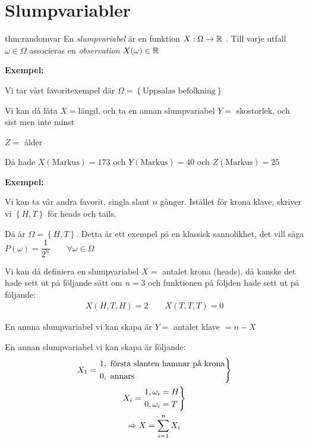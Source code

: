 \section{Slumpvariabler}
\par\bigskip
\begin{theo}[Slumpvariabel]{thm:randomvar}
  En \textit{slumpvariabel} är en funktion $X:\Omega\to\mathbb{R}$ . Till varje utfall $\omega\in\Omega$ associeras en \textit{observation} $X(\omega)\in\mathbb{R}$
\end{theo}
\par\bigskip
\noindent\textbf{Exempel:}\par
\noindent Vi tar vårt favoritexempel där $\Omega = \left\{\text{Uppsalas befolkning}\right\}$ \par
\noindent Vi kan då låta $X = $längd, och ta en annan slumpvariabel $Y = $ skostorlek, och sist men inte minst\par\noindent $Z =$ ålder\par
\noindent Då hade $X(\text{Markus}) = 173$ och $Y(\text{Markus}) = 40$ och $Z(\text{Markus})=25$
\par\bigskip
\noindent\textbf{Exempel:}\par
\noindent Vi kan ta vår andra favorit, singla slant $n$ gånger. Istället för krona klave, skriver vi $\left\{H,T\right\}$ för heads och tails.\par
\noindent Då är $\Omega = \left\{H,T\right\}$. Detta är ett exempel på en klassisk sannolikhet, det vill säga $P(\omega) = \dfrac{1}{2^n}\qquad\forall \omega\in\Omega$\par
\noindent Vi kan då definiera en slumpvariabel $X=$ antalet krona (heads), då kanske det hade sett ut på följande sätt om $n=3$ och funktionen på följden hade sett ut på följande:
\begin{equation*}
  \begin{gathered}
    X(H,T,H) = 2\qquad X(T,T,T) = 0
  \end{gathered}
\end{equation*}
\par\bigskip
\noindent En annna slumpvariabel vi kan skapa är $Y=$ antalet klave $=n-X$\par
\noindent En annan slumpvariabel vi kan skapa är följande:
\begin{equation*}
  \begin{gathered}
    X_1=
    \begin{rcases*}
      1,\text{ första slanten hamnar på krona}\\
      0, \text{ annars}
    \end{rcases*}\\
    X_i =
    \begin{rcases*}
      1, \omega_i = H\\
      0, \omega_i = T
    \end{rcases*}\\
    \Rightarrow X= \sum_{i=1}^{n}X_i
  \end{gathered}
\end{equation*}
